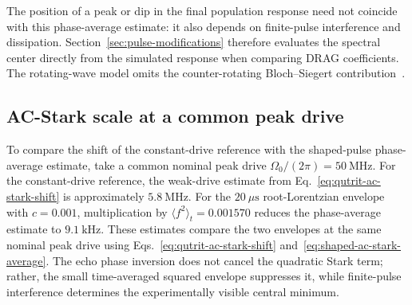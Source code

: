 The position of a peak or dip in the final population response need not
coincide with this phase-average estimate: it also depends on finite-pulse
interference and dissipation. Section~\ref{sec:pulse-modifications}
therefore evaluates the spectral center directly from the simulated
response when comparing DRAG coefficients. The rotating-wave model omits
the counter-rotating Bloch--Siegert contribution~\cite{tuorila_stark_2010}.

\subsection{AC-Stark scale at a common peak drive}

To compare the shift of the constant-drive reference with the shaped-pulse
phase-average estimate, take a common nominal peak drive
$\Omega_0/(2\pi)=50~\mathrm{MHz}$. For the constant-drive reference,
the weak-drive estimate from Eq.~\eqref{eq:qutrit-ac-stark-shift} is approximately
$5.8~\mathrm{MHz}$.  For the $20~\mu\mathrm{s}$ root-Lorentzian envelope
with $c=0.001$, multiplication by
$\langle f^2\rangle_t=0.001570$ reduces the phase-average estimate to
$9.1~\mathrm{kHz}$. These estimates compare the two envelopes at the same
nominal peak drive using Eqs.~\eqref{eq:qutrit-ac-stark-shift}
and~\eqref{eq:shaped-ac-stark-average}. The echo phase
inversion does not cancel the quadratic Stark term; rather, the small
time-averaged squared envelope suppresses it, while finite-pulse interference
determines the experimentally visible central minimum.
